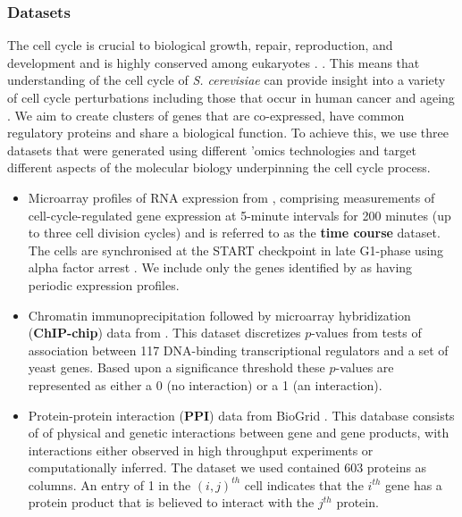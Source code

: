 \documentclass{bmcart}
\begin{document}
\subsubsection*{Datasets}
The cell cycle is crucial to biological growth, repair, reproduction, and development \citep{tyson2013cell, chen2004integrative, alberts2018molecular} and is highly conserved among eukaryotes \citep{alberts2018molecular}. . This means that understanding of the cell cycle of \emph{S. cerevisiae} can provide insight into a variety of cell cycle perturbations including those that occur in human cancer \citep{ingalls2007systems, chen2004integrative} and ageing \citep{jimenez2015live}. We aim to create clusters of genes that are co-expressed, have common regulatory proteins and share a biological function. To achieve this, we use three datasets that were generated using different 'omics technologies and target different aspects of the molecular biology underpinning the cell cycle process.
\begin{itemize}
    \item Microarray profiles of RNA expression from \cite{granovskaia2010high}, comprising measurements of cell-cycle-regulated gene expression at 5-minute intervals for 200 minutes (up to three cell division cycles) and is referred to as the \textbf{time course} dataset. The cells are synchronised at the START checkpoint in late G1-phase using alpha factor arrest
    \citep{granovskaia2010high}. We include only the genes identified by \cite{granovskaia2010high} as having periodic expression profiles.
    \item Chromatin immunoprecipitation followed by microarray hybridization (\textbf{ChIP-chip}) data from \cite{harbison2004transcriptional}. This dataset discretizes $p$-values from tests of association between 117 DNA-binding transcriptional regulators and a set of yeast genes. Based upon a significance threshold these $p$-values are represented as either a 0 (no interaction) or a 1 (an interaction).
    \item Protein-protein interaction (\textbf{PPI}) data from BioGrid \citep{stark2006biogrid}. This database consists of of physical and genetic interactions between gene and gene products, with interactions either observed in high throughput experiments or computationally inferred. The dataset we used contained 603 proteins as columns. An entry of 1 in the $(i, j)^{th}$ cell indicates that the $i^{th}$ gene has a protein product that is believed to interact with the $j^{th}$ protein.
\end{itemize}
\end{document}
